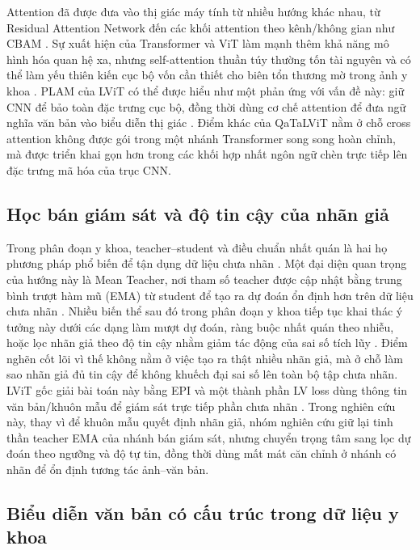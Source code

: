 Attention đã được đưa vào thị giác máy tính từ nhiều hướng khác nhau, từ Residual Attention Network đến các khối attention theo kênh/không gian như CBAM \cite{wang2017ran,woo2018cbam}. Sự xuất hiện của Transformer và ViT làm mạnh thêm khả năng mô hình hóa quan hệ xa, nhưng self-attention thuần túy thường tốn tài nguyên và có thể làm yếu thiên kiến cục bộ vốn cần thiết cho biên tổn thương mờ trong ảnh y khoa \cite{vaswani2017attention,dosovitskiy2020vit}. PLAM của LViT có thể được hiểu như một phản ứng với vấn đề này: giữ CNN để bảo toàn đặc trưng cục bộ, đồng thời dùng cơ chế attention để đưa ngữ nghĩa văn bản vào biểu diễn thị giác \cite{li2023lvit}. Điểm khác của QaTaLViT nằm ở chỗ cross attention không được gói trong một nhánh Transformer song song hoàn chỉnh, mà được triển khai gọn hơn trong các khối hợp nhất ngôn ngữ chèn trực tiếp lên đặc trưng mã hóa của trục CNN.

\subsection{Học bán giám sát và độ tin cậy của nhãn giả}

Trong phân đoạn y khoa, teacher--student và điều chuẩn nhất quán là hai họ phương pháp phổ biến để tận dụng dữ liệu chưa nhãn \cite{tarvainen2017meanteacher,luo2021dtc}. Một đại diện quan trọng của hướng này là Mean Teacher, nơi tham số teacher được cập nhật bằng trung bình trượt hàm mũ (EMA) từ student để tạo ra dự đoán ổn định hơn trên dữ liệu chưa nhãn \cite{tarvainen2017meanteacher}. Nhiều biến thể sau đó trong phân đoạn y khoa tiếp tục khai thác ý tưởng này dưới các dạng làm mượt dự đoán, ràng buộc nhất quán theo nhiễu, hoặc lọc nhãn giả theo độ tin cậy nhằm giảm tác động của sai số tích lũy \cite{luo2021dtc}. Điểm nghẽn cốt lõi vì thế không nằm ở việc tạo ra thật nhiều nhãn giả, mà ở chỗ làm sao nhãn giả đủ tin cậy để không khuếch đại sai số lên toàn bộ tập chưa nhãn. LViT gốc giải bài toán này bằng EPI và một thành phần LV loss dùng thông tin văn bản/khuôn mẫu để giám sát trực tiếp phần chưa nhãn \cite{li2023lvit}. Trong nghiên cứu này, thay vì để khuôn mẫu quyết định nhãn giả, nhóm nghiên cứu giữ lại tinh thần teacher EMA của nhánh bán giám sát, nhưng chuyển trọng tâm sang lọc dự đoán theo ngưỡng và độ tự tin, đồng thời dùng mất mát căn chỉnh ở nhánh có nhãn để ổn định tương tác ảnh--văn bản.

\subsection{Biểu diễn văn bản có cấu trúc trong dữ liệu y khoa}

